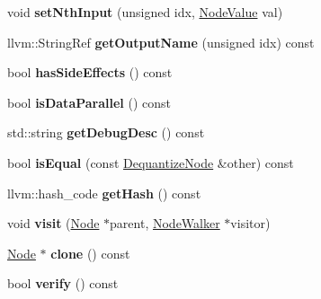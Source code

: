 \begin{DoxyCompactItemize}
\mbox{\label{classglow_1_1_dequantize_node_a8e6df565f28408463131561c3251dc38}} 
void {\bfseries set\+Nth\+Input} (unsigned idx, \hyperlink{structglow_1_1_node_value}{Node\+Value} val)
\item 
\mbox{\label{classglow_1_1_dequantize_node_a2a5ed36b932a4b3ab5221ad0b64d56cc}} 
llvm\+::\+String\+Ref {\bfseries get\+Output\+Name} (unsigned idx) const
\item 
\mbox{\label{classglow_1_1_dequantize_node_a4b0d10a27d9ab49f1550f7f73bc50974}} 
bool {\bfseries has\+Side\+Effects} () const
\item 
\mbox{\label{classglow_1_1_dequantize_node_a7dd065f0d22086e9ecd608ce36f250a6}} 
bool {\bfseries is\+Data\+Parallel} () const
\item 
\mbox{\label{classglow_1_1_dequantize_node_ad4ffe2ca3033a67c7841186f4deff44b}} 
std\+::string {\bfseries get\+Debug\+Desc} () const
\item 
\mbox{\label{classglow_1_1_dequantize_node_acf8c43a76c8619b24254c1e118ca6fef}} 
bool {\bfseries is\+Equal} (const \hyperlink{classglow_1_1_dequantize_node}{Dequantize\+Node} \&other) const
\item 
\mbox{\label{classglow_1_1_dequantize_node_a7e0fe194eec887a478e0e192f862fa26}} 
llvm\+::hash\+\_\+code {\bfseries get\+Hash} () const
\item 
\mbox{\label{classglow_1_1_dequantize_node_a471f744f5ddd9cc7167caf04f16c82c6}} 
void {\bfseries visit} (\hyperlink{classglow_1_1_node}{Node} $\ast$parent, \hyperlink{classglow_1_1_node_walker}{Node\+Walker} $\ast$visitor)
\item 
\mbox{\label{classglow_1_1_dequantize_node_aaa433f4e00e28753dc881ece6a1d77f7}} 
\hyperlink{classglow_1_1_node}{Node} $\ast$ {\bfseries clone} () const
\item 
\mbox{\label{classglow_1_1_dequantize_node_af542def87220f3a9ffe0e7dd95e24fa9}} 
bool {\bfseries verify} () const
\end{DoxyCompactItemize}
